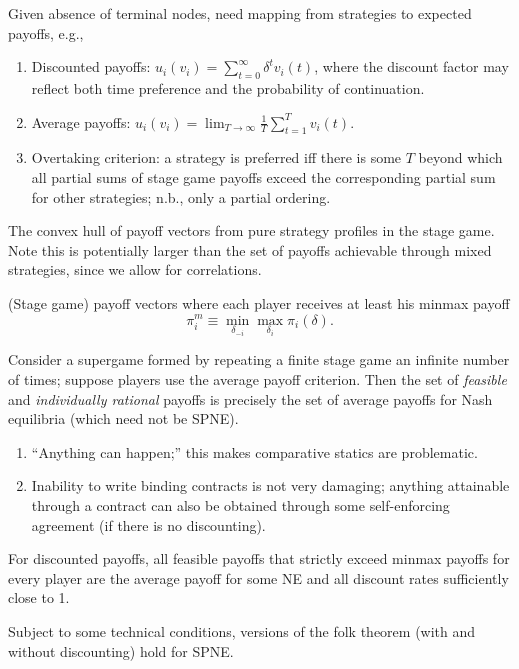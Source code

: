 \documentclass[8pt,letterpaper, landscape]{extarticle} %
\begin{document}
\begin{multicols}{3}
\begin{description}
Given absence of terminal nodes, need mapping from strategies to expected payoffs, e.g.,
\begin{enumerate}
\item Discounted payoffs: $ u_i (v_i) = \sum_{t=0}^{\infty} \delta^{t} v_i (t) $, where the discount factor may reflect both time preference and the probability of continuation.
\item Average payoffs: $ u_i (v_i) = \lim_{T \to \infty} \tfrac{1}{T} \sum_{t=1}^{T} v_i (t) $.
\item Overtaking criterion: a strategy is preferred iff there is some $ T $ beyond which all partial sums of stage game payoffs exceed the corresponding partial sum for other strategies; n.b., only a partial ordering.
\end{enumerate}

 The convex hull of payoff vectors from pure strategy profiles in the stage game. Note this is potentially larger than the set of payoffs achievable through mixed strategies, since we allow for correlations.

 (Stage game) payoff vectors where each player receives at least his minmax payoff
\[ \pi_{i}^{m} \equiv \min_{\delta_{-i}} \max_{\delta_{i}} \pi_{i} (\delta). \]

 Consider a supergame formed by repeating a finite stage game an infinite number of times; suppose players use the average payoff criterion. Then the set of \textit{feasible} and \textit{individually rational} payoffs is precisely the set of average payoffs for Nash equilibria (which need not be SPNE).
\begin{enumerate}
\item ``Anything can happen;'' this makes comparative statics are problematic.
\item Inability to write binding contracts is not very damaging; anything attainable through a contract can also be obtained through some self-enforcing agreement (if there is no discounting).
\end{enumerate}

For discounted payoffs, all feasible payoffs that strictly exceed minmax payoffs for every player are the average payoff for some NE and all discount rates sufficiently close to 1.

Subject to some technical conditions, versions of the folk theorem (with and without discounting) hold for SPNE.


\end{description}
\end{multicols}
\end{document}
